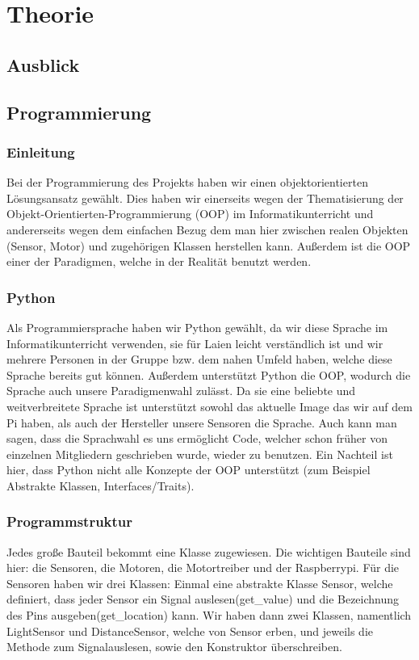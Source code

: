 \documentclass{report}
\begin{document}
\chapter{Theorie}

\section{Ausblick}

\section{Programmierung}

\subsection{Einleitung}
Bei der Programmierung des Projekts haben wir einen objektorientierten Lösungsansatz gewählt. Dies haben wir einerseits wegen der Thematisierung der Objekt-Orientierten-Programmierung (OOP) im Informatikunterricht und andererseits wegen dem einfachen Bezug dem man hier zwischen realen Objekten (Sensor, Motor) und zugehörigen Klassen herstellen kann. Außerdem ist die OOP einer der Paradigmen, welche in der Realität benutzt werden. 

\subsection{Python}
Als Programmiersprache haben wir Python gewählt, da wir diese Sprache im Informatikunterricht verwenden, sie für Laien leicht verständlich ist und wir mehrere Personen in der Gruppe bzw. dem nahen Umfeld haben, welche diese Sprache bereits gut können. Außerdem unterstützt Python die OOP, wodurch die Sprache auch unsere Paradigmenwahl zulässt. Da sie eine beliebte und weitverbreitete Sprache ist unterstützt sowohl das aktuelle Image das wir auf dem Pi haben, als auch der Hersteller unsere Sensoren die Sprache. Auch kann man sagen, dass die Sprachwahl es uns ermöglicht Code, welcher schon früher von einzelnen Mitgliedern geschrieben wurde, wieder zu benutzen.  Ein Nachteil ist hier, dass Python nicht alle Konzepte der OOP unterstützt (zum Beispiel Abstrakte Klassen, Interfaces/Traits).

\subsection{Programmstruktur}
Jedes große Bauteil bekommt eine Klasse zugewiesen. Die wichtigen Bauteile sind hier: die Sensoren, die Motoren, die Motortreiber und der Raspberrypi. Für die Sensoren haben wir drei Klassen: Einmal eine abstrakte Klasse Sensor, welche definiert, dass jeder Sensor ein Signal auslesen(get\_value) und die Bezeichnung des Pins ausgeben(get\_location) kann. Wir haben dann zwei Klassen, namentlich LightSensor und DistanceSensor, welche von Sensor erben, und jeweils die Methode zum Signalauslesen, sowie den Konstruktor überschreiben.
\end{document}
